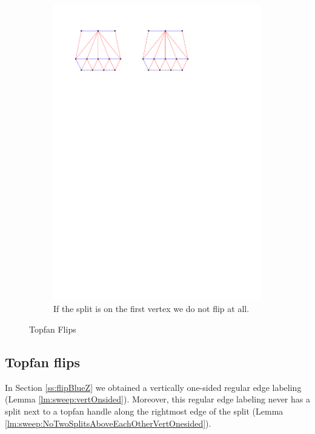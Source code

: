 \begin{figure}[!b]
\begin{subfigure}[b]{0.45 \textwidth}
        \includegraphics[width =\textwidth]{topFanFlips/img/splitfront}
        \caption{If the split is on the first vertex we do not flip at all.}
        \label{fig:fanflip:splitFirstVertex}
    \end{subfigure}

    \caption{Topfan Flips}
    \label{fig:fanflip:fanflips}
\end{figure}

\subsection{Topfan flips}
\thispagestyle{plain}
\label{ss:fanflip}

In Section \ref{ss:flipBlueZ} we obtained a vertically one-sided regular edge labeling (Lemma \ref{lm:sweep:vertOnsided}).
Moreover, this regular edge labeling never has a split next to a topfan handle along the rightmost edge of the split (Lemma \ref{lm:sweep:NoTwoSplitsAboveEachOtherVertOnesided}).

